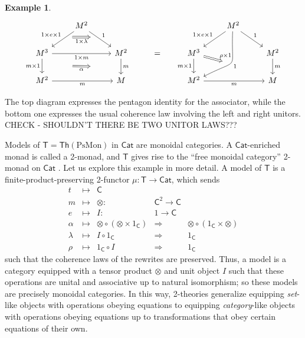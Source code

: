 \documentclass{amsart}
\theoremstyle{definition}
\newtheorem{example}[theorem]{Example}
\newcommand{\Th}{\mathsf{Th}}
\newcommand{\Cat}{\mathsf{Cat}}
\newcommand{\C}{\mathsf{C}}
\newcommand{\T}{\mathsf{T}}
\newcommand{\maps}{\colon}
\begin{document}
\begin{example}
      \[\begin{tikzcd}
          & M^2 \ar[dl,"1\times e\times 1",""name=a1,swap] \ar[dr,"1",""name=a2] \arrow[Rightarrow,from=a1,to=a2,"1\times \lambda",swap,shorten >=0.4cm,shorten <=0.4cm] & && & M^2 \ar[dl,"1\times e\times 1",swap] \ar[dr,"1"] \ar[ddl,bend left =30,looseness=2, "1",""name=c1] & \\
          M^3 \ar[d,"m\times 1",swap,""name=b1] \ar[rr,"1\times m",swap] && M^2 \ar[d,"m",""name=b2] \arrow[Rightarrow,from=b1,to=b2,"\alpha",shorten >=1.3cm,shorten <=1.3cm,swap] & = & M^3 \ar[d,"m\times 1",swap] \arrow[Rightarrow,to=c1,"\rho\times 1",shorten >=0.4cm,shorten <=0.0cm] && M^2 \ar[d,"m"] \\
          M^2 \ar[rr,"m",swap] && M && M^2 \ar[rr,"m",swap] && M
        \end{tikzcd}\]
    \end{example}   
\noindent The top diagram expresses the pentagon identity for the associator, while the bottom one expresses the usual coherence law involving the left and right unitors.  CHECK - SHOULDN'T THERE BE TWO UNITOR LAWS???
   
Models of $\T = \Th(\mathrm{PsMon})$ in $\Cat$ are monoidal categories.   A $\Cat$-enriched monad is called a 2-monad, and $\T$ gives rise to the ``free monoidal category'' 2-monad on $\Cat$ \cite{bkp}.
Let us explore this example in more detail.  A model of $\T$ is a finite-product-preserving 2-functor $\mu\colon \T\to \Cat$, which sends 
\[\begin{array}{rclcl}
	t & \mapsto & \C &&\\
	m & \mapsto & \otimes\maps & \C^2 \to \C &\\
	e & \mapsto & I\maps & 1\to \C &\\
	\alpha & \mapsto & \otimes \circ (\otimes \times 1_\C) & \Rightarrow & \otimes \circ (1_\C \times \otimes)\\
	\lambda & \mapsto & I\circ 1_\C & \Rightarrow & 1_\C\\
	\rho & \mapsto & 1_\C \circ I & \Rightarrow & 1_\C
\end{array}\]
such that the coherence laws of the rewrites are preserved.  Thus, a model is a category equipped with a tensor product $\otimes$ and unit object $I$ such that these operations are unital and associative up to natural isomorphism; so these models are precisely monoidal categories. In this way, 2-theories generalize equipping \textit{set}-like objects  with operations obeying equations to equipping \textit{category}-like objects with operations obeying equations up to 
transformations that obey certain equations of their own.
\end{document}

